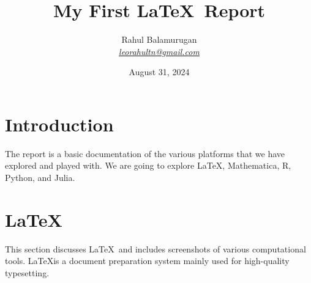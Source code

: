 \documentclass[12pt]{article}
\title{ My First \LaTeX\ Report}
\author{Rahul Balamurugan \\ \textit{\href{mailto:leorahultn@gmail.com}{leorahultn@gmail.com}}}
\date{August 31, 2024}
\begin{document}
\maketitle

\tableofcontents
\newpage

\section{Introduction}

The report is a basic documentation of the various platforms that we have explored and played with. We are going to explore \LaTeX , Mathematica, R, Python, and Julia.

\newpage

\section{\LaTeX}

This section discusses \LaTeX\ and includes screenshots of various computational tools. \LaTeX is a document preparation system mainly used for high-quality typesetting.
\end{document}
